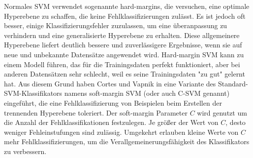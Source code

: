 \begin{figure}[h] 
\label{fig:kernel_trick} \end{figure} %

Normales SVM verwendet sogenannte hard-margins, die versuchen, eine optimale Hyperebene zu schaffen, die keine Fehlklassifizierungen zul{\"a}sst. 
Es ist jedoch oft besser, einige Klassifizierungsfehler zuzulassen, um eine {\"u}beranpassung zu verhindern und eine generalisierte Hyperebene zu erhalten. Diese allgemeinere Hyperebene liefert deutlich bessere und zuverl{\"a}ssigere Ergebnisse, wenn sie auf neue und unbekannte Datens{\"a}tze angewendet wird.
Hard-margin SVM kann zu einem Modell f{\"u}hren, das f{\"u}r die Trainingsdaten perfekt funktioniert, aber bei anderen Datens{\"a}tzen sehr schlecht, weil es seine Trainingsdaten "zu gut" gelernt hat.
Aus diesem Grund haben Cortes und Vapnik in \cite{svn1995} eine Variante des Standard-SVM-Klassifikators namens soft-margin SVM (oder auch C-SVM genannt) eingef{\"u}hrt, die eine Fehlklassifizierung von Beispielen beim Erstellen der trennenden Hyperebene toleriert.
Der soft-margin Parameter $C$ wird genutzt um die Anzahl der Fehlklassifikationen festzulegen.
Je gr{\"o}{\ss}er der Wert von $C$, desto weniger Fehleinstufungen sind zul{\"a}ssig.
Umgekehrt erlauben kleine Werte von $C$ mehr Fehlklassifizierungen, um die Verallgemeinerungsf{\"a}higkeit des Klassifikators zu verbessern. \\

